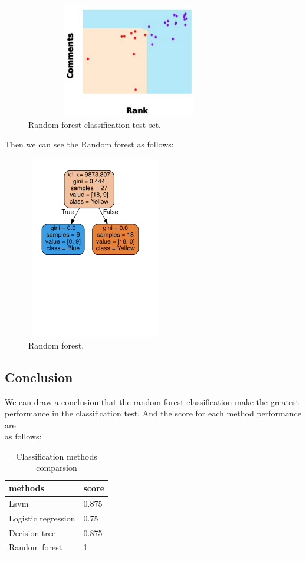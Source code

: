 \documentclass[12pt, a4paper]{article}
\begin{document}
\begin{figure}[ht]
    \centering
    \includegraphics[width=9cm,height=5cm]{p14.png}
    \caption{Random forest classification test set.}
\end{figure}
\pagebreak[4]
Then we can see the Random forest as follows:

\begin{figure}[ht]
    \centering
    \includegraphics[width=6cm,height=8cm]{p15.pdf}
    \caption{Random forest.}
\end{figure}
\newpage
\subsection{Conclusion}
We can draw a conclusion that the random forest classification make
the  greatest \\performance in the classification test.
And the score for each method performance are \\as follows:
\newline

  
    
    \begin{table}[H]
    \begin{tabular}{|l|l|}

    \hline
    methods             & score \\ \hline
    Lsvm                & 0.875 \\ \hline
    Logistic regression & 0.75  \\ \hline
    Decision tree       & 0.875 \\ \hline
    Random forest       & 1     \\ \hline
 
    \end{tabular}
    \caption{Classification methods comparsion} \label{tab:sometab}
\end{table}
\end{document}
